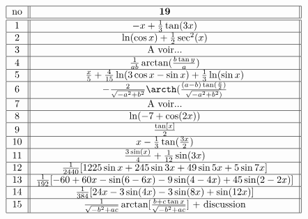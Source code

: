 \[ \begin{tabular}{| c || c ||  }
\hline       no &         ${\bf 19}                                          $                                                                                                               \\    \hline \hline
             $1$   & $-x+\frac{1}{3}\tan(3x)$            \\ \hline 
            $2$   &  $ \ln(\cos x)+\frac{1}{2}\sec^2(x)$                 \\ \hline
           $3$   &   A voir...						\\ \hline 
           $4$   &      $   \frac{1}{ab}\arctan(\frac{b\tan y}{a})             $     \\ \hline 
              $5$   &      $  \frac{x}{5}+\frac{4}{15}\ln(3\cos x-\sin x) + \frac{1}{3}\ln(\sin x)    $   				 \\ \hline
               $6$  &      $-\frac{2}{\sqrt{-a^2+b^2}}\arcth(\frac{(a-b)\tan(\frac{x}{2})}{\sqrt{-a^2+b^2})}$                \\ \hline
              $7$ &     A voir...                       \\ \hline
               $8$ &     $\ln(-7 + \cos(2 x))$  			                                                                                \\ \hline
              $9$     &     $\frac{\tan[x]}{2}$  			                                                                       \\ \hline
               $10$  &  $x - \frac{1}{3}\tan(\frac{3x}{2})$  			                                                               \\ \hline
              $11$  &  $\frac{3\sin(x)}{4}+\frac{1}{12}\sin(3x)$			                                                               \\ \hline   
               $12$ &  $\frac{1}{2440}[1225\sin x +245\sin 3x+49\sin 5x + 5\sin 7x]$			                                                               \\ \hline   
              $13$  &  $\frac{1}{192}[-60+60x -\sin(6-6x) -9\sin(4-4x)+45\sin(2-2x)]$			                                                               \\ \hline   
              $14$  &  $\frac{1}{384}[24x -3\sin(4x) -3\sin(8x)+\sin(12x)]$			                                                               \\ \hline   
              $15$  &  $\frac{1}{\sqrt{-b^2+ac}}\arctan[\frac{b+c\tan x}{\sqrt{-b^2+ac}}]$ + discussion			                                                               \\ \hline   

\end{tabular}\]

